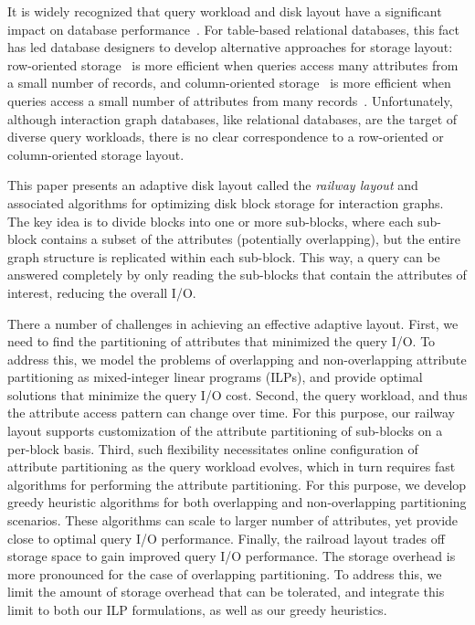 It is widely recognized that query workload and disk layout have a significant
impact on database performance~\cite{alagiannis14,grund10,stonebraker05}.  For
table-based relational databases, this fact has led database designers to
develop alternative approaches for storage layout: row-oriented
storage~\cite{rowOrg} is more efficient when queries access many attributes
from a small number of records, and column-oriented storage~\cite{colOrg} is
more efficient when queries access a small number of attributes from many
records~\cite{stonebraker05}.  Unfortunately, although interaction graph
databases, like relational databases, are the target of diverse query
workloads, there is no clear correspondence to a row-oriented or
column-oriented storage layout.

This paper presents an adaptive disk layout called the \emph{railway layout}
and associated algorithms for optimizing disk block storage for interaction
graphs. The key idea is to divide blocks into one or more sub-blocks, where
each sub-block contains a subset of the attributes (potentially overlapping),
but the entire graph structure is replicated within each sub-block. This way,
a query can be answered completely by only reading the sub-blocks that contain
the attributes of interest, reducing the overall I/O. 

There a number of challenges in achieving an effective adaptive layout. First,
we need to find the partitioning of attributes that minimized the query I/O.
To address this, we model the problems of overlapping and non-overlapping
attribute partitioning as mixed-integer linear programs (ILPs), and provide
optimal solutions that minimize the query I/O cost. Second, the query
workload, and thus the attribute access pattern can change over time. For this
purpose, our railway layout supports customization of the attribute
partitioning of sub-blocks on a per-block basis. Third, such flexibility
necessitates online configuration of attribute partitioning as the query
workload evolves, which in turn requires fast algorithms for performing the
attribute partitioning. For this purpose, we develop greedy heuristic
algorithms for both overlapping and non-overlapping partitioning scenarios.
These algorithms can scale to larger number of attributes, yet provide close
to optimal query I/O performance. Finally, the railroad layout trades off
storage space to gain improved query I/O performance. The storage overhead is
more pronounced for the case of overlapping partitioning. To address this, we
limit the amount of storage  overhead that can be tolerated, and integrate
this limit to both our ILP formulations, as well as our greedy heuristics.

